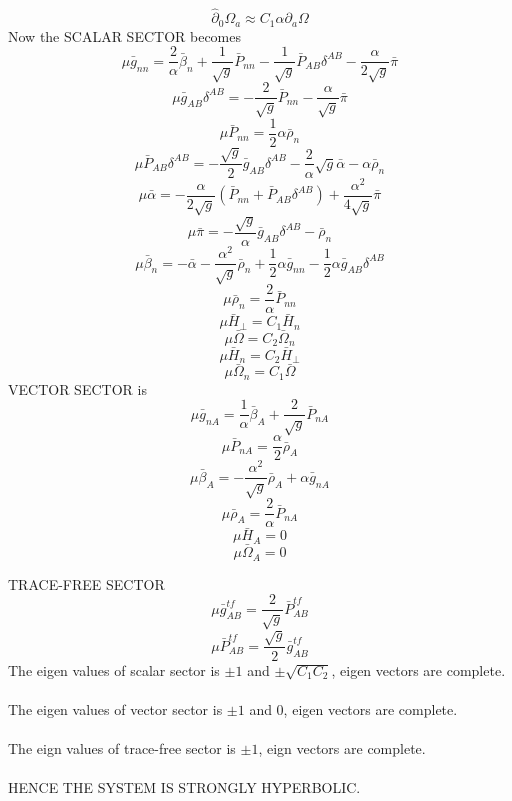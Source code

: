 \documentclass{article}
\begin{document}
\[
{\hat \partial}_{0}\Omega_{a} \approx C_{1}\alpha \partial_{a}\Omega
\]
Now the SCALAR SECTOR becomes
\[
\mu {\bar g}_{nn} = \frac{2}{\alpha} {\bar \beta}_{n} + \frac{1}{\sqrt{g}}{\bar P}_{nn} - \frac{1}{\sqrt{g}}{\bar P}_{AB}\delta^{AB} - \frac{\alpha}{2\sqrt{g}}{\bar \pi}
\]
\[
\mu {\bar g}_{AB}\delta^{AB} = -\frac{2}{\sqrt{g}}{\bar P}_{nn} - \frac{\alpha}{\sqrt{g}}{\bar \pi} 
\]
\[
\mu {\bar P}_{nn} = \frac{1}{2}\alpha {\bar \rho}_{n}
\]
\[
\mu {\bar P}_{AB}\delta^{AB} = -\frac{\sqrt{g}}{2}{\bar g}_{AB}\delta^{AB} - \frac{2}{\alpha}\sqrt{g}{\bar \alpha} - \alpha {\bar \rho}_{n}
\]
\[
\mu {\bar \alpha} = -\frac{\alpha}{2\sqrt{g}}({\bar P}_{nn} + {\bar P}_{AB}\delta^{AB}) + \frac{\alpha^{2}}{4\sqrt{g}}{\bar \pi}
\]
\[
\mu {\bar \pi} = -\frac{\sqrt{g}}{\alpha} {\bar g}_{AB}\delta^{AB} - {\bar \rho}_{n}
\]
\[
\mu {\bar \beta}_{n} = - {\bar \alpha} - \frac{\alpha^{2}}{\sqrt{g}}{\bar \rho}_{n}  + \frac{1}{2}\alpha {\bar g}_{nn} - \frac{1}{2}\alpha {\bar g}_{AB}\delta^{AB}
\]
\[
\mu {\bar \rho}_{n} = \frac{2}{\alpha}{\bar P}_{nn}
\]
\[
\mu {\bar H}_{\perp} = C_{1}{\bar H}_{n}
\]
\[
\mu {\bar \Omega} = C_{2}{\bar \Omega}_{n}
\]
\[
\mu {\bar H}_{n} = C_{2}{\bar H}_{\perp}
\]
\[
\mu {\bar \Omega}_{n} = C_{1}{\bar \Omega}
\]
VECTOR SECTOR is
\[
\mu {\bar g}_{nA} = \frac{1}{\alpha}{\bar \beta}_{A} + \frac{2}{\sqrt{g}}{\bar P}_{nA}
\]
\[
\mu {\bar P}_{nA} = \frac{\alpha}{2}{\bar \rho}_{A}
\]
\[
\mu {\bar \beta}_{A} = -\frac{\alpha^{2}}{\sqrt{g}}{\bar \rho}_{A}  + \alpha {\bar g}_{nA}
\]
\[
\mu {\bar \rho}_{A} = \frac{2}{\alpha}{\bar P}_{nA}
\]
\[
\mu {\bar H}_{A} = 0
\]
\[
\mu {\bar \Omega}_{A} = 0
\]

TRACE-FREE SECTOR
\[
\mu {\bar g}^{tf}_{AB} = \frac{2}{\sqrt{g}}{\bar P}^{tf}_{AB} 
\]
\[
\mu {\bar P}^{tf}_{AB} = \frac{\sqrt{g}}{2}{\bar g}^{tf}_{AB}
\]
The eigen values of scalar sector is $\pm 1$ and $\pm \sqrt{C_{1}C_{2}}$, eigen vectors are complete. \\
\\
The eigen values of vector sector is $\pm 1$ and 0, eigen vectors are complete. \\
\\
The eign values of trace-free sector is $\pm 1$, eign vectors are complete. 
\\
\\
HENCE THE SYSTEM IS STRONGLY HYPERBOLIC. 
\end{document}
